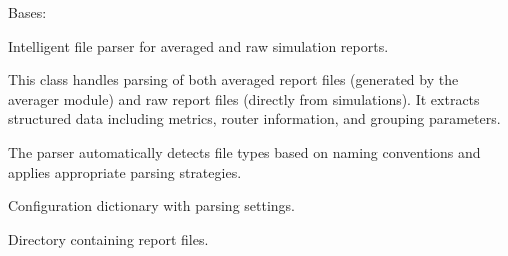 \documentclass[a4paper,11pt,english,openany,oneside]{sphinxmanual}
\begin{document}

\begin{fulllineitems}
\label{\detokenize{modules/core:core.analysis.SmartFileParser}}
\pysigstartsignatures
\pysiglinewithargsret
{}
{}
{}
\pysigstopsignatures
\sphinxAtStartPar
Bases: 

\sphinxAtStartPar
Intelligent file parser for averaged and raw simulation reports.

\sphinxAtStartPar
This class handles parsing of both averaged report files (generated by
the averager module) and raw report files (directly from simulations).
It extracts structured data including metrics, router information,
and grouping parameters.

\sphinxAtStartPar
The parser automatically detects file types based on naming conventions
and applies appropriate parsing strategies.

\begin{fulllineitems}
\label{\detokenize{modules/core:core.analysis.SmartFileParser.config}}
\pysigstartsignatures
\pysigline
{}
\pysigstopsignatures
\sphinxAtStartPar
Configuration dictionary with parsing settings.
\begin{quote}\begin{description}
\sphinxAtStartPar
{}

\end{description}\end{quote}

\end{fulllineitems}


\begin{fulllineitems}
\label{\detokenize{modules/core:core.analysis.SmartFileParser.report_dir}}
\pysigstartsignatures
\pysigline
{}
\pysigstopsignatures
\sphinxAtStartPar
Directory containing report files.
\begin{quote}\begin{description}
\sphinxAtStartPar
{}


\end{description}
\end{quote}
\end{fulllineitems}
\end{fulllineitems}
\end{document}
